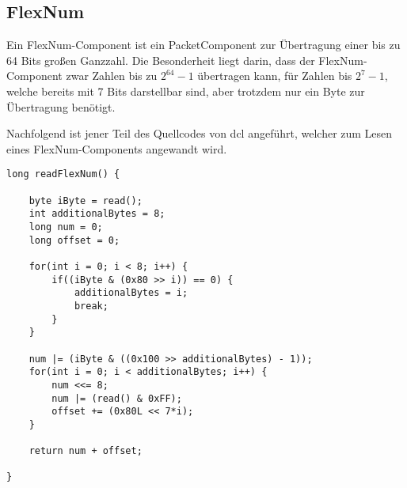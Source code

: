 
\subsection*{FlexNum}
\label{dcl-packetcomponents-flexnum}
Ein \gls{FlexNum}-Component ist ein \gls{PacketComponent} zur Übertragung einer bis zu 64 Bits großen
Ganzzahl.
Die Besonderheit liegt darin, dass der \gls{FlexNum}-Component zwar Zahlen bis zu $2^{64}-1$ übertragen
kann, für Zahlen bis $2^{7}-1$, welche bereits mit 7 Bits darstellbar sind, aber trotzdem nur ein Byte
zur Übertragung benötigt.


Nachfolgend ist jener Teil des Quellcodes von \gls{dcl} angeführt, welcher zum Lesen eines
\gls{FlexNum}-Components angewandt wird.

\javalisting
\begin{minipage}{\linewidth}
\begin{lstlisting}[caption={Lesen eines \gls*{FlexNum}-Components (Java)},captionpos=b]
long readFlexNum() {
	
	byte iByte = read();
	int additionalBytes = 8;
	long num = 0;
	long offset = 0;
	
	for(int i = 0; i < 8; i++) {
		if((iByte & (0x80 >> i)) == 0) {
			additionalBytes = i;
			break;
		}
	}
	
	num |= (iByte & ((0x100 >> additionalBytes) - 1));
	for(int i = 0; i < additionalBytes; i++) {
		num <<= 8;
		num |= (read() & 0xFF);
		offset += (0x80L << 7*i);
	}
	
	return num + offset;
	
}
\end{lstlisting}
\end{minipage}



